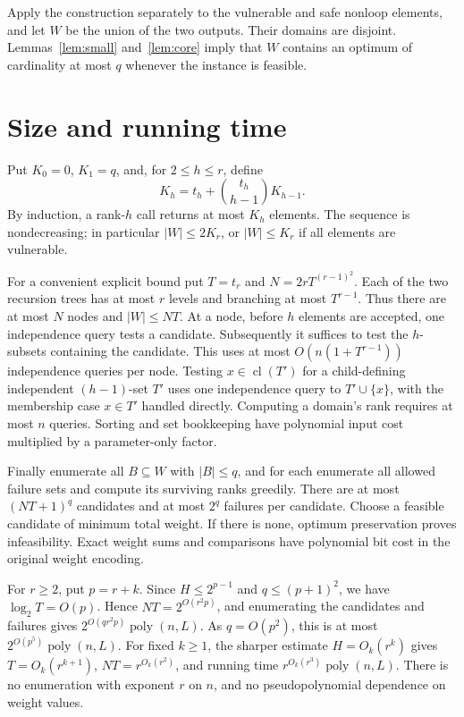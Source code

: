 \documentclass[11pt]{article}
\theoremstyle{definition}\newtheorem{definition}[theorem]{Definition}
\theoremstyle{remark}\newtheorem{remark}[theorem]{Remark}
\DeclareMathOperator{\cl}{cl}
\begin{document}
Apply the construction separately to the vulnerable and safe nonloop elements, and let $W$ be the union of the two outputs. Their domains are disjoint. Lemmas~\ref{lem:small} and~\ref{lem:core} imply that $W$ contains an optimum of cardinality at most $q$ whenever the instance is feasible.

\section{Size and running time}
Put $K_0=0$, $K_1=q$, and, for $2\leq h\leq r$, define
\[
 K_h=t_h+\binom{t_h}{h-1}K_{h-1}.
\]
By induction, a rank-$h$ call returns at most $K_h$ elements. The sequence is nondecreasing; in particular $|W|\leq2K_r$, or $|W|\leq K_r$ if all elements are vulnerable.

For a convenient explicit bound put $T=t_r$ and $N=2rT^{(r-1)^2}$. Each of the two recursion trees has at most $r$ levels and branching at most $T^{r-1}$. Thus there are at most $N$ nodes and $|W|\leq NT$. At a node, before $h$ elements are accepted, one independence query tests a candidate. Subsequently it suffices to test the $h$-subsets containing the candidate. This uses at most $O(n(1+T^{r-1}))$ independence queries per node. Testing $x\in\cl(T')$ for a child-defining independent $(h-1)$-set $T'$ uses one independence query to $T'\cup\{x\}$, with the membership case $x\in T'$ handled directly. Computing a domain's rank requires at most $n$ queries. Sorting and set bookkeeping have polynomial input cost multiplied by a parameter-only factor.

Finally enumerate all $B\subseteq W$ with $|B|\leq q$, and for each enumerate all allowed failure sets and compute its surviving ranks greedily. There are at most $(NT+1)^q$ candidates and at most $2^q$ failures per candidate. Choose a feasible candidate of minimum total weight. If there is none, optimum preservation proves infeasibility. Exact weight sums and comparisons have polynomial bit cost in the original weight encoding.

For $r\geq2$, put $p=r+k$. Since $H\leq2^{p-1}$ and $q\leq(p+1)^2$, we have $\log_2 T=O(p)$. Hence $NT=2^{O(r^2p)}$, and enumerating the candidates and failures gives $2^{O(qr^2p)}\operatorname{poly}(n,L)$. As $q=O(p^2)$, this is at most $2^{O(p^5)}\operatorname{poly}(n,L)$. For fixed $k\geq1$, the sharper estimate $H=O_k(r^k)$ gives $T=O_k(r^{k+1})$, $NT=r^{O_k(r^2)}$, and running time $r^{O_k(r^3)}\operatorname{poly}(n,L)$. There is no enumeration with exponent $r$ on $n$, and no pseudopolynomial dependence on weight values.
\end{document}

